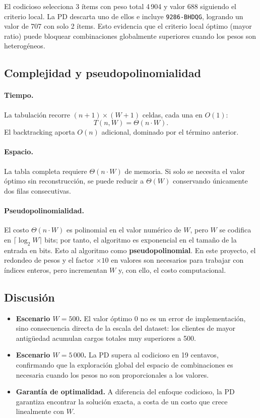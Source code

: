 \documentclass[12pt, a4paper]{article}
\begin{document}
El codicioso selecciona 3 ítems con peso total 4\,904 y valor 688 siguiendo el criterio local. La PD descarta uno de ellos e incluye \texttt{9286-BHDQG}, logrando un valor de 707 con solo 2 ítems. Esto evidencia que el criterio local óptimo (mayor ratio) puede bloquear combinaciones globalmente superiores cuando los pesos son heterogéneos.

\subsection{Complejidad y pseudopolinomialidad}

\paragraph{Tiempo.} La tabulación recorre $(n+1) \times (W+1)$ celdas, cada una en $O(1)$:
\[
  T(n, W) = \Theta(n \cdot W).
\]
El backtracking aporta $O(n)$ adicional, dominado por el término anterior.

\paragraph{Espacio.} La tabla completa requiere $\Theta(n \cdot W)$ de memoria. Si solo se necesita el valor óptimo sin reconstrucción, se puede reducir a $\Theta(W)$ conservando únicamente dos filas consecutivas.

\paragraph{Pseudopolinomialidad.} El costo $\Theta(n \cdot W)$ es polinomial en el valor numérico de $W$, pero $W$ se codifica en $\lceil \log_2 W \rceil$ bits; por tanto, el algoritmo es exponencial en el tamaño de la entrada en bits. Esto al algoritmo como \textbf{pseudopolinomial}. En este proyecto, el redondeo de pesos y el factor $\times 10$ en valores son necesarios para trabajar con índices enteros, pero incrementan $W$ y, con ello, el costo computacional.

\subsection{Discusión}

\begin{itemize}
  \item \textbf{Escenario $W = 500$.} El valor óptimo $0$ no es un error de implementación, sino consecuencia directa de la escala del dataset: los clientes de mayor antigüedad acumulan cargos totales muy superiores a 500.

  \item \textbf{Escenario $W = 5\,000$.} La PD supera al codicioso en 19 centavos, confirmando que la exploración global del espacio de combinaciones es necesaria cuando los pesos no son proporcionales a los valores.

  \item \textbf{Garantía de optimalidad.} A diferencia del enfoque codicioso, la PD garantiza encontrar la solución exacta, a costa de un costo que crece linealmente con $W$.
\end{itemize}
\end{document}
